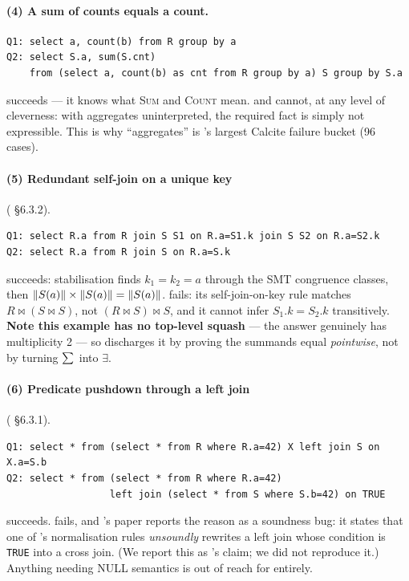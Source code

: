 \paragraph{(4) A sum of counts equals a count.}
\begin{lstlisting}[style=sql]
Q1: select a, count(b) from R group by a
Q2: select S.a, sum(S.cnt)
    from (select a, count(b) as cnt from R group by a) S group by S.a
\end{lstlisting}
\sqlsolver{} \textcolor{cGreen}{succeeds} --- it knows what \textsc{Sum} and \textsc{Count}
mean. \udp{} and \QED{} \textcolor{cRed}{cannot}, at any level of cleverness: with
aggregates uninterpreted, the required fact is simply not expressible. This is why
``aggregates'' is \QED{}'s largest Calcite failure bucket (96 cases).

\paragraph{(5) Redundant self-join on a unique key} (\cite{qed} \S6.3.2).
\begin{lstlisting}[style=sql]
Q1: select R.a from R join S S1 on R.a=S1.k join S S2 on R.a=S2.k
Q2: select R.a from R join S on R.a=S.k
\end{lstlisting}
\QED{} \textcolor{cGreen}{succeeds}: stabilisation finds $k_1=k_2=a$ through the SMT
congruence classes, then $\left\lVert S(a) \right\rVert\times\left\lVert S(a) \right\rVert=\left\lVert S(a) \right\rVert$.
\spes{} \textcolor{cRed}{fails}: its self-join-on-key rule matches $R\bowtie(S\bowtie S)$, not
$(R\bowtie S)\bowtie S$, and it cannot infer $S_1.k=S_2.k$ transitively.
\textbf{Note this example has no top-level squash} --- the answer genuinely has multiplicity
2 --- so \QED{} discharges it by proving the summands equal \emph{pointwise}, not by turning
$\sum_{}$ into $\exists$.

\paragraph{(6) Predicate pushdown through a left join} (\cite{qed} \S6.3.1).
\begin{lstlisting}[style=sql]
Q1: select * from (select * from R where R.a=42) X left join S on X.a=S.b
Q2: select * from (select * from R where R.a=42)
                  left join (select * from S where S.b=42) on TRUE
\end{lstlisting}
\QED{} \textcolor{cGreen}{succeeds}. \spes{} \textcolor{cRed}{fails}, and \QED{}'s paper
reports the reason as a soundness bug: it states that one of \spes{}'s normalisation rules
\emph{unsoundly} rewrites a left join whose condition is \texttt{TRUE} into a cross join.
(We report this as \cite{qed}'s claim; we did not reproduce it.) Anything needing NULL semantics
is out of reach for \udp{} entirely.

